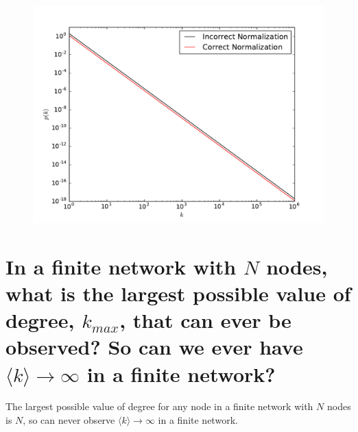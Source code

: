 \documentclass[onecolumn,10pt]{jhwhw}
\begin{document}
\begin{figure}[h!]
\begin{center}
\includegraphics[height=0.45\textheight]{p1.pdf}
\end{center}
\end{figure}

\part{In a finite network with $N$ nodes, what is the largest possible value of degree, $k_{max}$, that can ever be observed? So can we ever have $\langle k \rangle \rightarrow \infty$ in a finite network?}

The largest possible value of degree for any node in a finite network with $N$ nodes is $N$, so can never observe $\langle k \rangle \rightarrow \infty$ in a finite network.



\end{document}

